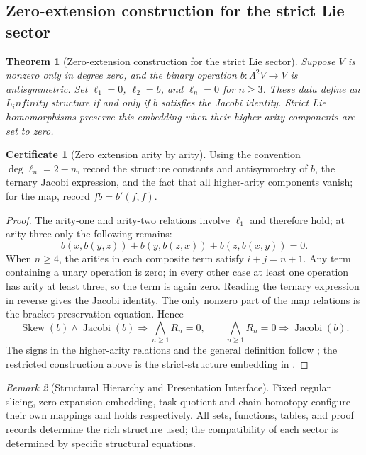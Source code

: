 \documentclass[12pt,a4paper,openany,notitlepage]{report}
\theoremstyle{plain}
\newtheorem{theorem}{Theorem}[chapter]
\theoremstyle{definition}
\newtheorem*{certificate}{Certificate}
\theoremstyle{remark}
\newtheorem{remark}[theorem]{Remark}
\def\mathcal#1{#1}\def\mathsf#1{#1}\def\mathbb#1{#1}%
\def\infty{infinity}\def\Gamma{Gamma}\def\Phi{Phi}%
\begin{document}
\begin{CJK*}
\section { Zero-extension construction for the strict Lie sector }
\begin{theorem} [Zero-extension construction for the strict Lie sector]
\label{hgov:thm:strictlie}
Suppose $V$ is nonzero only in degree zero, and the binary operation $b:\Lambda^2V\to V$ is antisymmetric. Set $\ell_1=0$, $\ell_2=b$, and $\ell_n=0$ for $n\ge3$. These data define an $L_\infty$ structure if and only if $b$ satisfies the Jacobi identity. Strict Lie homomorphisms preserve this embedding when their higher-arity components are set to zero.
\end{theorem}
\begin{certificate} [Zero extension arity by arity]
Using the convention $\deg\ell_n=2-n$, record the structure constants and antisymmetry of $b$, the ternary Jacobi expression, and the fact that all higher-arity components vanish; for the map, record $fb=b'(f,f)$.
\end{certificate}
\begin{proof}
The arity-one and arity-two relations involve $\ell_1$ and therefore hold; at arity three only the following remains:
\[
b(x,b(y,z))+b(y,b(z,x))+b(z,b(x,y))=0.
\]
When $n\ge4$, the arities in each composite term satisfy $i+j=n+1$. Any term containing a unary operation is zero; in every other case at least one operation has arity at least three, so the term is again zero. Reading the ternary expression in reverse gives the Jacobi identity. The only nonzero part of the map relations is the bracket-preservation equation. Hence
\[
\operatorname{Skew}(b)\land\operatorname{Jacobi}(b)
\Rightarrow\bigwedge_{n\ge1}\mathcal R_n=0,
\qquad
\bigwedge_{n\ge1}\mathcal R_n=0\Rightarrow\operatorname{Jacobi}(b).
\]
The signs in the higher-arity relations and the general definition follow \cite{ExtLadaMarkl}; the restricted construction above is the strict-structure embedding in \cite{S38}.
\end{proof}

\begin{remark}
[Structural Hierarchy and Presentation Interface]Fixed regular slicing, zero-expansion embedding, task quotient and chain homotopy configure their own mappings and holds respectively. All sets, functions, tables, and proof records determine the rich structure used; the compatibility of each sector is determined by specific structural equations.\end{remark}



\end{CJK*}
\end{document}
